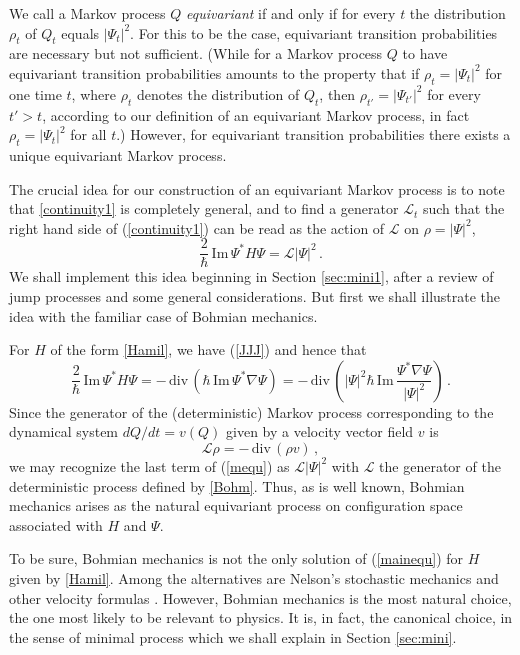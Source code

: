 \documentclass[12pt]{article}
\newcommand{\1}{\mathbf{1}} %
\renewcommand{\Im}{\mathrm{Im}} %
\renewcommand{\div}{\,\mathrm{div}\,} %
\newcommand{\generator}{\mathscr{L}} %
\begin{document}
We call a Markov process $Q$ \emph{equivariant} if and only if for every
$t$ the distribution $\rho_t$ of $Q_t$ equals $|\Psi_t|^2$. For this to 
be
the case, equivariant transition probabilities are necessary but not
sufficient. (While  for a Markov process $Q$  to have equivariant
transition probabilities amounts to the property that if $\rho_t =
|\Psi_t|^2$ for one time $t$, where $\rho_t$ denotes the distribution of
$Q_t$, then $\rho_{t'} = |\Psi_{t'}|^2$ for every $t'>t$,  according to
our definition of an equivariant Markov process, in fact $\rho_t =
|\Psi_t|^2$ for all $t$.)  However, for equivariant transition
probabilities there exists a unique equivariant Markov process.

The crucial idea for our construction of an equivariant Markov process
is to note that \eqref{continuity1} is completely general, and to find
a generator $\generator_t$ such that the right hand side of
(\ref{continuity1}) can be read as the action of $\generator$ on $\rho
= |\Psi|^2$,
\begin{equation}\label{mainequ}
    \frac{2}{\hbar} \, \Im \, \Psi^* H\Psi = \generator |\Psi|^2\,.
\end{equation}
We shall implement this idea beginning in Section \ref{sec:mini1},
after a review of jump processes and some general considerations. But
first we shall illustrate the idea with the familiar case of Bohmian
mechanics.

For $H$ of the form \eqref{Hamil}, we have (\ref{JJJ}) and hence that
\begin{equation}\label{mequ}
   \frac{2}{\hbar} \, \Im \, \Psi^*H\Psi = -\div\left(\hbar \, \Im \,
   \Psi^* \nabla\Psi \right) = -\div\left( |\Psi|^2 \hbar \, \Im \,
   \frac{\Psi^* \nabla\Psi} {|\Psi|^2} \right) \,.
\end{equation}
Since the generator of the (deterministic) Markov process
corresponding to the dynamical system $dQ/dt=v(Q)$ given by a velocity
vector field $v$ is
\begin{equation}\label{dynamical}
   \generator \rho = -\div(\rho v)\,,
\end{equation}
we may recognize the last term of (\ref{mequ}) as $\generator
|\Psi|^2$ with $\generator$ the generator of the deterministic process
defined by \eqref{Bohm}. Thus, as is well known, Bohmian mechanics
arises as the natural equivariant process on configuration space
associated with $H$ and $\Psi$.

To be sure, Bohmian mechanics is not the only solution of
(\ref{mainequ}) for $H$ given by \eqref{Hamil}. Among the alternatives
are Nelson's stochastic mechanics \cite{stochmech} and other velocity
formulas \cite{Deotto}. However, Bohmian mechanics is the most natural
choice, the one most likely to be relevant to physics. It is, in fact,
the canonical choice, in the sense of minimal process which we shall
explain in Section \ref{sec:mini}.
\end{document}
